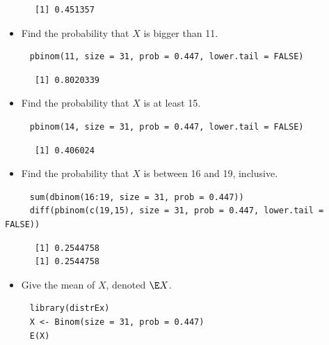 \documentclass[captions=tableheading]{scrbook}
\begin{document}
\begin{xca}
\begin{verbatim}
      [1] 0.451357
\end{verbatim}

\begin{itemize}
\item Find the probability that \(X\) is bigger than 11.
\end{itemize}

\begin{verbatim}
     pbinom(11, size = 31, prob = 0.447, lower.tail = FALSE)
\end{verbatim}

\begin{verbatim}
      [1] 0.8020339
\end{verbatim}

\begin{itemize}
\item Find the probability that \(X\) is at least 15.
\end{itemize}

\begin{verbatim}
     pbinom(14, size = 31, prob = 0.447, lower.tail = FALSE)
\end{verbatim}

\begin{verbatim}
      [1] 0.406024
\end{verbatim}

\begin{itemize}
\item Find the probability that \(X\) is between 16 and 19, inclusive.
\end{itemize}

\begin{verbatim}
     sum(dbinom(16:19, size = 31, prob = 0.447))
     diff(pbinom(c(19,15), size = 31, prob = 0.447, lower.tail = FALSE))
\end{verbatim}

\begin{verbatim}
      [1] 0.2544758
      [1] 0.2544758
\end{verbatim}

\begin{itemize}
\item Give the mean of \(X\), denoted \(\E X\).
\end{itemize}

\begin{verbatim}
     library(distrEx)
     X <- Binom(size = 31, prob = 0.447)
     E(X)
\end{verbatim}


\end{xca}
\end{document}

